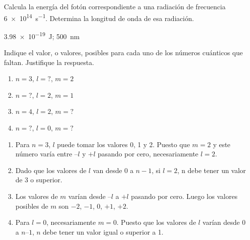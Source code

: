 \begin{exercise}[
    tags    = {frecuencia, fotón, radiación, energía, longitud de onda, constante de Plank},
    topics  = {química, física, cuántica, Plank},
    source  = {FQ 1B OXF 2015, p103, e32},
  ]
  Calcula la energía del fotón correspondiente a una radiación de frecuencia \SI{6e14}{s^{-1}}. Determina la longitud de onda de esa radiación.
\end{exercise}

\begin{solution}
  \SI{3.98e-19}{\joule}; \SI{500}{\nano\meter}
\end{solution}



\begin{exercise}[
    tags    = {números cuánticos, electrones, átomo},
    topics  = {química, cuántica, modelos atómicos},
    source  = {EBAU-Q 2013, extraordinaria fase general},
  ]
  Indique el valor, o valores, posibles para cada uno de los números cuánticos que faltan. Justifique la respuesta.
  \begin{enumerate}
    \item \( n = 3 \), \( l = ? \), \( m = 2 \)
    \item \( n = ? \), \( l = 2 \), \( m = 1 \)
    \item \( n = 4 \), \( l = 2 \), \( m = ? \)
    \item \( n = ? \), \( l = 0 \), \( m = ? \)
  \end{enumerate}
\end{exercise}

\begin{solution}
  \begin{enumerate}
    \item Para \( n = 3 \), \( l \) puede tomar los valores 0, 1 y 2. Puesto que \( m = 2 \) y este número varía entre \(–l\) y \(+l\) pasando por cero, necesariamente \( l = 2 \).
    \item Dado que los valores de \(l\) van desde 0 a \( n-1 \), si \( l = 2 \), n debe tener un valor de 3 o superior.
    \item Los valores de \(m\) varían desde \(–l\) a \(+l\) pasando por cero. Luego los valores posibles de \(m\) son \(-2\), \(-1\), 0, \(+1\), \(+2\).
    \item Para \( l = 0 \), necesariamente \( m = 0 \). Puesto que los valores de \(l\) varían desde 0 a \( n – 1 \), \(n\) debe tener un valor igual o superior a 1.
  \end{enumerate}
\end{solution}



